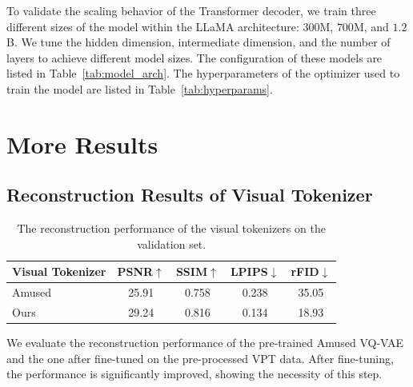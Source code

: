 \documentclass{article} %
\begin{document}
To validate the scaling behavior of the Transformer decoder, we train three different sizes of the model within the LLaMA architecture: $300$M, $700$M, and $1.2$B. We tune the hidden dimension, intermediate dimension, and the number of layers to achieve different model sizes. The configuration of these models are listed in Table~\ref{tab:model_arch}. The hyperparameters of the optimizer used to train the model are listed in Table~\ref{tab:hyperparams}.

\section{More Results}
\label{app:more_results}

\subsection{Reconstruction Results of Visual Tokenizer}

\begin{table}[htbp]
\begin{center}
\footnotesize
\caption{The reconstruction performance of the visual tokenizers on the validation set.}
	\label{tab:visual_tokenizer}
        \setlength\tabcolsep{8pt}
        \renewcommand\arraystretch{1.1}
	\begin{tabular}{l|cccc}
		\toprule[1pt]
		Visual Tokenizer & PSNR$\uparrow$ & SSIM$\uparrow$ & LPIPS$\downarrow$ & rFID$\downarrow$ \\
		\midrule
		Amused~\citep{patil2024amused} & 25.91 & 0.758 & 0.238 & 35.05 \\
        Ours & 29.24 & 0.816 & 0.134 & 18.93 \\
		\bottomrule[1pt]
	\end{tabular}
\end{center}
\end{table}

We evaluate the reconstruction performance of the pre-trained Amused VQ-VAE~\citep{patil2024amused} and the one after fine-tuned on the pre-processed VPT data. After fine-tuning, the performance is significantly improved, showing the necessity of this step. 
\end{document}
